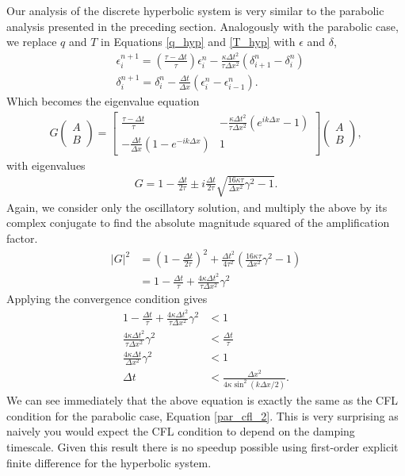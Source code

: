\documentclass[iop]{emulateapj}
\begin{document}
				Our analysis of the discrete hyperbolic system is very similar to the parabolic analysis presented in the preceding section.
				Analogously with the parabolic case, we replace $q$ and $T$ in Equations \ref{q_hyp} and \ref{T_hyp} with $\epsilon$ and $\delta$,
				\begin{align}
					&\epsilon_i^{n+1} = \left( \frac{\tau - \Delta t}{\tau} \right) \epsilon_i^n - \frac{\kappa \Delta t^2}{\tau \Delta x^2} \left( \delta_{i+1}^n - \delta_i^n \right) \\
					&\delta_i^{n+1} = \delta_i^n - \frac{\Delta t}{\Delta x} \left( \epsilon_i^n - \epsilon_{i-1}^n \right).
				\end{align}
				Which becomes the eigenvalue equation
				\begin{align}
				G \begin{pmatrix}
				A \\
				B
				\end{pmatrix} = \begin{bmatrix}
				\frac{\tau - \Delta t}{\tau} & -\frac{\kappa \Delta t^2}{\tau \Delta x^2} \left( e^{i k \Delta x} - 1 \right) \\
				-\frac{\Delta t}{\Delta x} \left( 1 - e^{-i k \Delta x} \right) & 1
				\end{bmatrix}
				\begin{pmatrix}
				A \\
				B
				\end{pmatrix}, \label{hyp_mat}
				\end{align}
				with eigenvalues
				\begin{align}
					G = 1 - \frac{\Delta t}{2 \tau} \pm i \frac{\Delta t}{2 \tau} \sqrt{\frac{16 \kappa \tau}{\Delta x^2} \gamma^2 - 1}.
				\end{align}
				Again, we consider only the oscillatory solution, and multiply the above by its complex conjugate to find the absolute magnitude squared of the amplification factor.
				\begin{align}
					|G|^2 &= \left( 1 - \frac{\Delta t}{2 \tau} \right)^2 + \frac{\Delta t^2}{4 \tau^2} \left( \frac{16 \kappa \tau}{\Delta x^2} \gamma^2 - 1 \right) \\
						  &= 1 - \frac{\Delta t}{\tau} + \frac{4 \kappa \Delta t^2}{\tau \Delta x^2} \gamma^2
				\end{align}
				Applying the convergence condition gives
				\begin{align}
					1 - \frac{\Delta t}{\tau} + \frac{4 \kappa \Delta t^2}{\tau \Delta x^2} \gamma^2 &< 1 \\
					\frac{4 \kappa \Delta t^2}{\tau \Delta x^2} \gamma^2 &< \frac{\Delta t}{\tau} \\
					\frac{4 \kappa \Delta t}{\Delta x^2} \gamma^2 &< 1 \\
					\Delta t &< \frac{\Delta x^2}{4 \kappa \sin^2(k \Delta x / 2)}.
				\end{align}
				We can see immediately that the above equation is exactly the same as the CFL condition for the parabolic case, Equation \ref{par_cfl_2}.
				This is very surprising as naively you would expect the CFL condition to depend on the damping timescale.
				Given this result there is no speedup possible using first-order explicit finite difference for the hyperbolic system.
			
\end{document}
